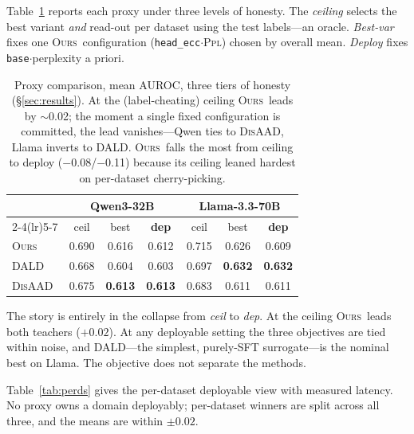 \documentclass[11pt]{article}
\newcommand{\ours}{\textsc{Ours}}
\newcommand{\dald}{\textsc{DALD}}
\newcommand{\disaad}{\textsc{DisAAD}}
\newcommand{\ppl}{\textsc{Ppl}}
\newcommand{\best}[1]{\textbf{#1}}
\begin{document}
Table~\ref{tab:triptych} reports each proxy under three levels of honesty. The
\emph{ceiling} selects the best variant \emph{and} read-out per dataset using the test
labels---an oracle. \emph{Best-var} fixes one \ours\ configuration
(\texttt{head\_ecc}$\cdot$\ppl) chosen by overall mean. \emph{Deploy} fixes
\texttt{base}$\cdot$perplexity a priori.

\begin{table}[t]\centering\small
\setlength{\tabcolsep}{3.2pt}
\begin{tabular}{l ccc ccc}
\toprule
& \multicolumn{3}{c}{\textbf{Qwen3-32B}} & \multicolumn{3}{c}{\textbf{Llama-3.3-70B}}\\
\cmidrule(lr){2-4}\cmidrule(lr){5-7}
& ceil & best & \best{dep} & ceil & best & \best{dep}\\
\midrule
\ours   & 0.690 & 0.616 & 0.612 & 0.715 & 0.626 & 0.609\\
\dald   & 0.668 & 0.604 & 0.603 & 0.697 & \best{0.632} & \best{0.632}\\
\disaad & 0.675 & \best{0.613} & \best{0.613} & 0.683 & 0.611 & 0.611\\
\bottomrule
\end{tabular}
\caption{Proxy comparison, mean AUROC, three tiers of honesty (\S\ref{sec:results}).
At the (label-cheating) ceiling \ours\ leads by $\sim$0.02; the moment a single fixed
configuration is committed, the lead vanishes---Qwen ties to \disaad, Llama inverts to
\dald. \ours\ falls the most from ceiling to deploy ($-$0.08/$-$0.11) because its ceiling
leaned hardest on per-dataset cherry-picking.}
\label{tab:triptych}
\end{table}

The story is entirely in the collapse from \emph{ceil} to \emph{dep}. At the ceiling
\ours\ leads both teachers ($+0.02$). At any deployable setting the three objectives are
tied within noise, and \dald---the simplest, purely-SFT surrogate---is the nominal best
on Llama. The objective does not separate the methods.

Table~\ref{tab:perds} gives the per-dataset deployable view with measured latency. No
proxy owns a domain deployably; per-dataset winners are split across all three, and the
means are within $\pm0.02$.
\end{document}
